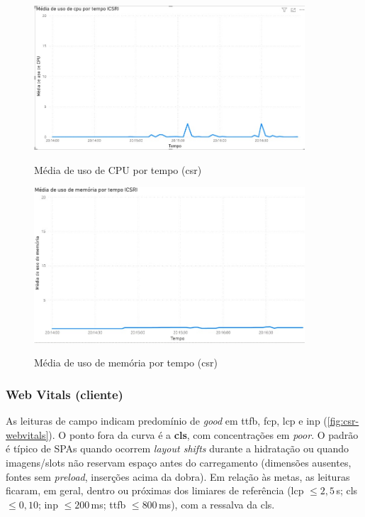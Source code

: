 \begin{figure}[H]
\centering
\caption{Média de uso de CPU por tempo (\acrshort{csr})}
\includegraphics[width=0.9\textwidth]{media/uso_cpu_csr.jpeg}
\label{fig:csr-cpu}
\end{figure}

\begin{figure}[H]
\centering
\caption{Média de uso de memória por tempo (\acrshort{csr})}
\includegraphics[width=0.9\textwidth]{media/uso_memoria_csr.jpeg}
\label{fig:csr-mem}
\end{figure}

\subsubsection{Web Vitals (cliente)}
As leituras de campo indicam predomínio de \textit{good} em \acrshort{ttfb}, \acrshort{fcp}, \acrshort{lcp} e \acrshort{inp} (\autoref{fig:csr-webvitals}). O ponto fora da curva é a \textbf{\acrshort{cls}}, com concentrações em \textit{poor}. O padrão é típico de SPAs quando ocorrem \emph{layout shifts} durante a hidratação ou quando imagens/slots não reservam espaço antes do carregamento (dimensões ausentes, fontes sem \emph{preload}, inserções acima da dobra). Em relação às metas, as leituras ficaram, em geral, dentro ou próximas dos limiares de referência (\acrshort{lcp} $\leq 2{,}5$\,s; \acrshort{cls} $\leq 0{,}10$; \acrshort{inp} $\leq 200$\,ms; \acrshort{ttfb} $\leq 800$\,ms), com a ressalva da \acrshort{cls}.

